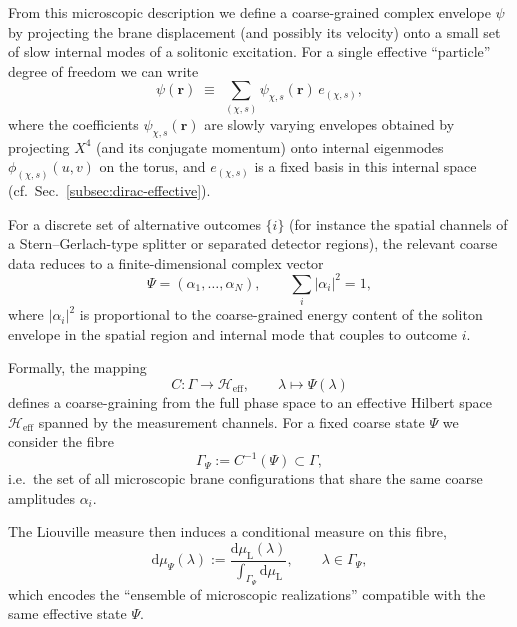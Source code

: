From this microscopic description we define a coarse-grained complex envelope $\psi$ by projecting the brane displacement (and possibly its velocity) onto a small set of slow internal modes of a solitonic excitation.
For a single effective ``particle'' degree of freedom we can write
\begin{equation}
  \psi(\mathbf r)
  \;\equiv\;
  \sum_{(\chi,s)} \psi_{\chi,s}(\mathbf r)\, e_{(\chi,s)},
\end{equation}
where the coefficients $\psi_{\chi,s}(\mathbf r)$ are slowly varying envelopes obtained by projecting $X^4$ (and its conjugate momentum) onto internal eigenmodes $\phi_{(\chi,s)}(u,v)$ on the torus, and $e_{(\chi,s)}$ is a fixed basis in this internal space (cf.\ Sec.~\ref{subsec:dirac-effective}).

For a discrete set of alternative outcomes $\{i\}$ (for instance the spatial channels of a Stern--Gerlach-type splitter or separated detector regions), the relevant coarse data reduces to a finite-dimensional complex vector
\begin{equation}
  \Psi = (\alpha_1, \dots, \alpha_N),
  \qquad
  \sum_i |\alpha_i|^2 = 1,
\end{equation}
where $|\alpha_i|^2$ is proportional to the coarse-grained energy content of the soliton envelope in the spatial region and internal mode that couples to outcome $i$.

Formally, the mapping
\begin{equation}
  C : \Gamma \to \mathcal{H}_{\mathrm{eff}},
  \qquad
  \lambda \mapsto \Psi(\lambda)
\end{equation}
defines a coarse-graining from the full phase space to an effective Hilbert space $\mathcal{H}_{\mathrm{eff}}$ spanned by the measurement channels.
For a fixed coarse state $\Psi$ we consider the fibre
\begin{equation}
  \Gamma_\Psi := C^{-1}(\Psi) \subset \Gamma,
\end{equation}
i.e.\ the set of all microscopic brane configurations that share the same coarse amplitudes $\alpha_i$.

The Liouville measure then induces a conditional measure on this fibre,
\begin{equation}
  \mathrm{d}\mu_\Psi(\lambda)
  :=
  \frac{\mathrm{d}\mu_{\mathrm{L}}(\lambda)}{\displaystyle\int_{\Gamma_\Psi} \mathrm{d}\mu_{\mathrm{L}}},
  \qquad
  \lambda \in \Gamma_\Psi,
\end{equation}
which encodes the ``ensemble of microscopic realizations'' compatible with the same effective state $\Psi$.

